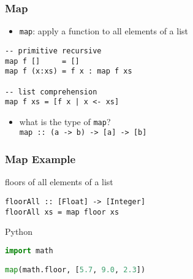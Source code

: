 \documentclass[dvipsnames]{beamer}
\theoremstyle{plain}
\begin{document}
\begin{frame}[fragile]
  \frametitle{Map}

  \begin{itemize}
    \item \lstinline|map|: apply a function to all elements of a list
  \end{itemize}

  \begin{exampleblock}{}
    \begin{lstlisting}[deletekeywords={map}]
-- primitive recursive
map f []     = []
map f (x:xs) = f x : map f xs

-- list comprehension
map f xs = [f x | x <- xs]
    \end{lstlisting}
  \end{exampleblock}

  \pause
  \begin{itemize}
    \item what is the type of \lstinline|map|?\\
      \lstinline|map :: (a -> b) -> [a] -> [b]|
  \end{itemize}
\end{frame}

\begin{frame}[fragile]
  \frametitle{Map Example}

  \begin{exampleblock}{floors of all elements of a list}
    \begin{lstlisting}
floorAll :: [Float] -> [Integer]
floorAll xs = map floor xs
    \end{lstlisting}
  \end{exampleblock}

  \bigskip
  \begin{exampleblock}{Python}
    \begin{lstlisting}[language=Python]
import math

map(math.floor, [5.7, 9.0, 2.3])
    \end{lstlisting}
  \end{exampleblock}
\end{frame}
\end{document}
